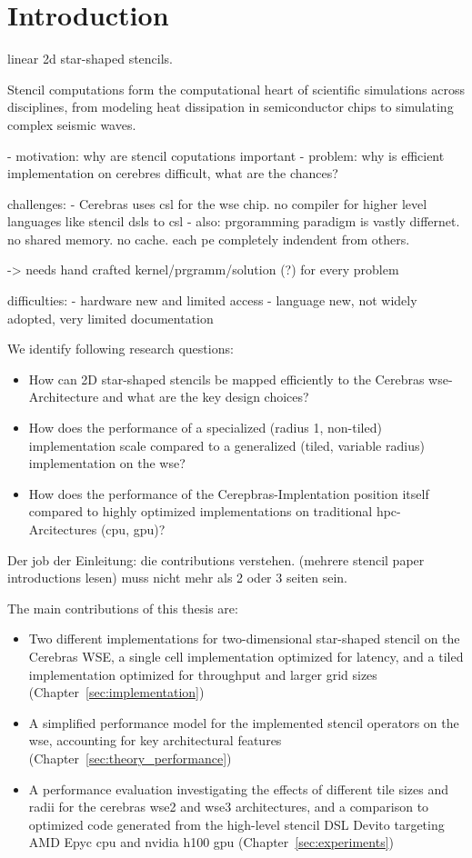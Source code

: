 \chapter{Introduction}

linear 2d star-shaped stencils. 

Stencil computations form the computational heart of scientific simulations across disciplines, from modeling heat dissipation in semiconductor chips to simulating complex seismic waves.

- motivation: why are stencil coputations important 
- problem: why is efficient implementation on cerebres difficult, what are the chances?

challenges:
- Cerebras uses \ac{csl} for the \ac{wse} chip. no compiler for higher level languages like stencil dsls to \ac{csl}
- also: prgoramming paradigm is vastly differnet. no shared memory. no cache. each \ac{pe} completely indendent from others.

-> needs hand crafted kernel/prgramm/solution (?) for every problem

difficulties:
- hardware new and limited access
- language new, not widely adopted, very limited documentation

We identify following research questions:
\begin{itemize}
    \item How can 2D star-shaped stencils be mapped efficiently to the Cerebras \ac{wse}-Architecture and what are the key design choices?
    \item How does the performance of a specialized (radius 1, non-tiled) implementation scale compared to a generalized (tiled, variable radius) implementation on the \ac{wse}?
    \item How does the performance of the Cerepbras-Implentation position itself compared to highly optimized implementations on traditional \ac{hpc}-Arcitectures (\ac{cpu}, \ac{gpu})? 
\end{itemize}

Der job der Einleitung: die contributions verstehen.
(mehrere stencil paper introductions lesen)
muss nicht mehr als 2 oder 3 seiten sein.

The main contributions of this thesis are:
\begin{itemize}
    \item Two different implementations for two-dimensional star-shaped stencil on the Cerebras WSE, a single cell implementation optimized for latency, and a tiled implementation optimized for throughput and larger grid sizes (Chapter~\autoref{sec:implementation})
    \item A simplified performance model for the implemented stencil operators on the \ac{wse}, accounting for key architectural features (Chapter~\autoref{sec:theory_performance})
    \item A performance evaluation investigating the effects of different tile sizes and radii for the cerebras wse2 and wse3 architectures, and a comparison to optimized code generated from the high-level stencil DSL Devito targeting AMD Epyc cpu and nvidia h100 gpu (Chapter~\autoref{sec:experiments})
\end{itemize}
